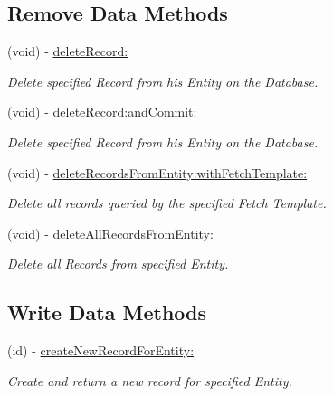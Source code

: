 \subsection*{Remove Data Methods}
\begin{DoxyCompactItemize}
\item 
(void) -\/ \hyperlink{interface_j_p_d_b_manager_action_ac566a65fcbfa1026f42954648d60e6b8}{deleteRecord:}
\begin{DoxyCompactList}\small\item\em Delete specified Record from his Entity on the Database. \item\end{DoxyCompactList}\item 
(void) -\/ \hyperlink{interface_j_p_d_b_manager_action_a7a8d41ed1791761c1996af5d031e41a7}{deleteRecord:andCommit:}
\begin{DoxyCompactList}\small\item\em Delete specified Record from his Entity on the Database. \item\end{DoxyCompactList}\item 
(void) -\/ \hyperlink{interface_j_p_d_b_manager_action_af85b28a738631615ad0e4030500ce71a}{deleteRecordsFromEntity:withFetchTemplate:}
\begin{DoxyCompactList}\small\item\em Delete all records queried by the specified Fetch Template. \item\end{DoxyCompactList}\item 
(void) -\/ \hyperlink{interface_j_p_d_b_manager_action_a1a7a137d9a6617366523dca5a59174a0}{deleteAllRecordsFromEntity:}
\begin{DoxyCompactList}\small\item\em Delete all Records from specified Entity. \item\end{DoxyCompactList}\end{DoxyCompactItemize}
\subsection*{Write Data Methods}
\begin{DoxyCompactItemize}
\item 
(id) -\/ \hyperlink{interface_j_p_d_b_manager_action_a64efbdc0e61408df85b45629141871e6}{createNewRecordForEntity:}
\begin{DoxyCompactList}\small\item\em Create and return a new record for specified Entity. \item\end{DoxyCompactList}\end{DoxyCompactItemize}


